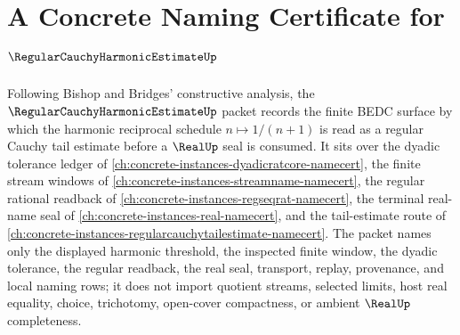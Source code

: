 \chapter{A Concrete Naming Certificate for $\RegularCauchyHarmonicEstimateUp$}
\label{ch:concrete-instances-regular-cauchy-harmonic-estimate-namecert}

Following Bishop and Bridges' constructive analysis, the $\RegularCauchyHarmonicEstimateUp$ packet records the finite BEDC surface by which the harmonic reciprocal schedule $n \mapsto 1/(n+1)$ is read as a regular Cauchy tail estimate before a $\RealUp$ seal is consumed. It sits over the dyadic tolerance ledger of \autoref{ch:concrete-instances-dyadicratcore-namecert}, the finite stream windows of \autoref{ch:concrete-instances-streamname-namecert}, the regular rational readback of \autoref{ch:concrete-instances-regseqrat-namecert}, the terminal real-name seal of \autoref{ch:concrete-instances-real-namecert}, and the tail-estimate route of \autoref{ch:concrete-instances-regularcauchytailestimate-namecert}. The packet names only the displayed harmonic threshold, the inspected finite window, the dyadic tolerance, the regular readback, the real seal, transport, replay, provenance, and local naming rows; it does not import quotient streams, selected limits, host real equality, choice, trichotomy, open-cover compactness, or ambient $\RealUp$ completeness.

